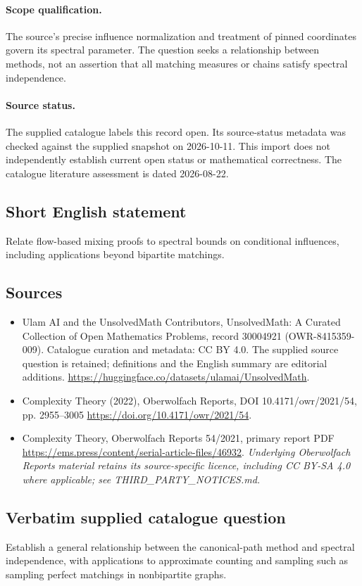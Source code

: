 \documentclass[11pt]{article}
\begin{document}
\paragraph{Scope qualification.}
The source's precise influence normalization and treatment of pinned coordinates govern its spectral parameter. The question seeks a relationship between methods, not an assertion that all matching measures or chains satisfy spectral independence.
\paragraph{Source status.}
The supplied catalogue labels this record open. Its source-status metadata was checked against the supplied snapshot on 2026-10-11. This import does not independently establish current open status or mathematical correctness. The catalogue literature assessment is dated 2026-08-22.
\subsection{Short English statement}
Relate flow-based mixing proofs to spectral bounds on conditional influences, including applications beyond bipartite matchings.
\subsection{Sources}
\begin{itemize}
\item[S1] Ulam AI and the UnsolvedMath Contributors, UnsolvedMath: A Curated Collection of Open Mathematics Problems, record 30004921 (OWR-8415359-009). Catalogue curation and metadata: CC BY 4.0. The supplied source question is retained; definitions and the English summary are editorial additions.
\url{https://huggingface.co/datasets/ulamai/UnsolvedMath}.
\item[S2] Complexity Theory (2022), Oberwolfach Reports, DOI 10.4171/owr/2021/54, pp. 2955--3005
\url{https://doi.org/10.4171/owr/2021/54}.
\item[S3] Complexity Theory, Oberwolfach Reports 54/2021, primary report PDF
\url{https://ems.press/content/serial-article-files/46932}.
\textit{Underlying Oberwolfach Reports material retains its source-specific licence, including CC BY-SA 4.0 where applicable; see THIRD\_PARTY\_NOTICES.md.}
\end{itemize}
\subsection{Verbatim supplied catalogue question}
Establish a general relationship between the canonical-path method and spectral independence, with applications to approximate counting and sampling such as sampling perfect matchings in nonbipartite graphs.
\end{document}
